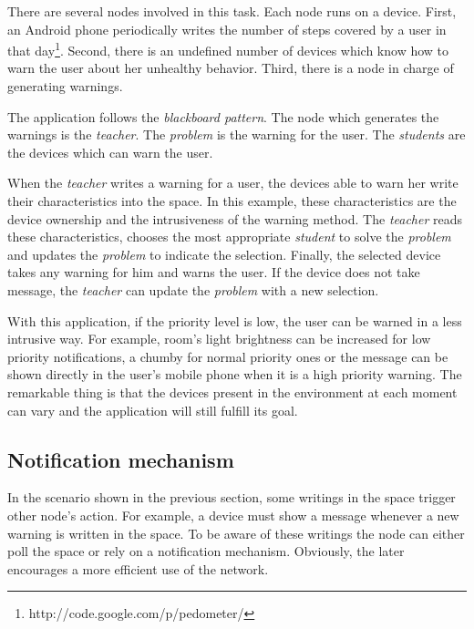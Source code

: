 There are several nodes involved in this task.
Each node runs on a device. %
First, an Android phone periodically writes the number of steps covered by a user in that day\footnote{http://code.google.com/p/pedometer/}.
Second, there is an undefined number of devices which know how to warn the user about her unhealthy behavior.
Third, there is a node in charge of generating warnings.


The application follows the \emph{blackboard pattern}.
The node which generates the warnings is the \emph{teacher}.
The \emph{problem} is the warning for the user.
The \emph{students} are the devices which can warn the user.


When the \emph{teacher} writes a warning for a user, the devices able to warn her write their characteristics into the space.
In this example, these characteristics are the device ownership and the intrusiveness of the warning method.
The \emph{teacher} reads these characteristics, chooses the most appropriate \emph{student} to solve the \emph{problem} and updates the \emph{problem} to indicate the selection.
Finally, the selected device takes any warning for him and warns the user. %
If the device does not take message, the \emph{teacher} can update the \emph{problem} with a new selection.


With this application, if the priority level is low, the user can be warned in a less intrusive way.
For example, room's light brightness can be increased for low priority notifications, a chumby for normal priority ones or the message can be shown directly in the user's mobile phone when it is a high priority warning.
The remarkable thing is that the devices present in the environment at each moment can vary and the application will still fulfill its goal.





\subsection{Notification mechanism}
\label{sec:notification}


In the scenario shown in the previous section, some writings in the space trigger other node's action.
For example, a device must show a message whenever a new warning is written in the space. %
To be aware of these writings the node can either poll the space or rely on a notification mechanism. %
Obviously, the later encourages a more efficient use of the network. %


